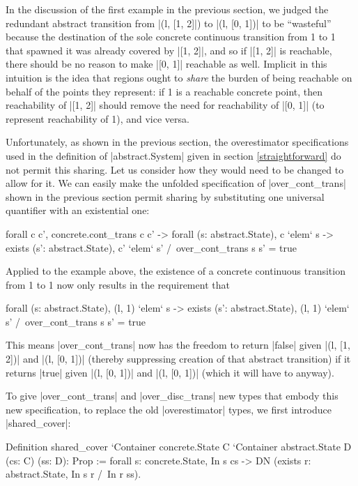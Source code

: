 \documentclass[runningheads]{llncs}
\begin{document}
{\noindent In the discussion of the first example in the previous section, we judged the redundant abstract transition from |(l, [1, 2]|) to |(l, [0, 1])| to be ``wasteful'' because the destination of the sole concrete continuous transition from 1 to 1 that spawned it was already covered by |[1, 2]|, and so if |[1, 2]| is reachable, there should be no reason to make |[0, 1]| reachable as well. Implicit in this intuition is the idea that regions ought to \emph{share} the burden of being reachable on behalf of the points they represent: if 1 is a reachable concrete point, then reachability of |[1, 2]| should remove the need for reachability of |[0, 1]| (to represent reachability of 1), and vice versa.

Unfortunately, as shown in the previous section, the overestimator specifications used in the definition of |abstract.System| given in section \ref{straightforward} do not permit this sharing. Let us consider how they would need to be changed to allow for it. We can easily make the unfolded specification of |over_cont_trans| shown in the previous section permit sharing by substituting one universal quantifier with an existential one:
\begin{code}
  forall c c', concrete.cont_trans c c' ->
  forall (s: abstract.State), c `elem` s ->
  exists (s': abstract.State), c' `elem` s' /\
    over_cont_trans s s' = true
\end{code}
Applied to the example above, the existence of a concrete continuous transition from 1 to 1 now only results in the requirement that
\begin{code}
  forall (s: abstract.State), (l, 1) `elem` s ->
  exists (s': abstract.State), (l, 1) `elem` s' /\
    over_cont_trans s s' = true
\end{code}
This means |over_cont_trans| now has the freedom to return |false| given |(l, [1, 2])| and |(l, [0, 1])| (thereby suppressing creation of that abstract transition) if it returns |true| given |(l, [0, 1])| and |(l, [0, 1])| (which it will have to anyway).

To give |over_cont_trans| and |over_disc_trans| new types that embody this new specification, to replace the old |overestimator| types, we first introduce |shared_cover|:
}

\begin{code}
  Definition shared_cover
    `{Container concrete.State C} `{Container abstract.State D}
      (cs: C) (ss: D): Prop :=
        forall s: concrete.State, In s cs -> DN (exists r: abstract.State, In s r /\ In r ss).
\end{code}
\end{document}
